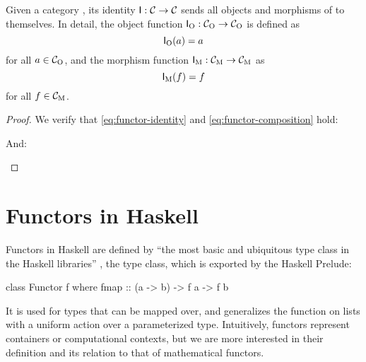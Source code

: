 \begin{example}
  \label{ex:functor-identity}


  Given a category , its identity  $\mathsf{I}:
  \mathcal{C} \to \mathcal{C}$ sends all objects and morphisms of  to
  themselves. In detail, the object function $\mathsf{I}_{\operatorname{O}}: \mathcal{C}_{\operatorname{O}} \to
  \mathcal{C}_{\operatorname{O}}$ is defined as
  \begin{equation}
    \label{eq:functor-identity-object}
    \mathsf{I}_{\operatorname{O}}(a) = a
  \end{equation}
  for all $a \in \mathcal{C}_{\operatorname{O}}$, and the morphism function $\mathsf{I}_{\operatorname{M}}:
  \mathcal{C}_{\operatorname{M}} \to \mathcal{C}_{\operatorname{M}}$ as
  \begin{equation}
    \label{eq:functor-identity-morphism}
    \mathsf{I}_{\operatorname{M}}(f) = f
  \end{equation}
  for all $f \in \mathcal{C}_{\operatorname{M}}$.

  \begin{proof}

    We verify that \eqref{eq:functor-identity} and
    \eqref{eq:functor-composition} hold:
    \begin{steps}
        \eqby{\eqref{eq:functor-identity-object}}
    \end{steps}
    And:
    \begin{steps}
    \end{steps}

  \end{proof}

\end{example}

\section{Functors in Haskell}
\label{sec:functors-haskell}

Functors in Haskell are defined by ``the most basic and ubiquitous
type class in the Haskell libraries'' \parencite[18]{yorgey-2009}, the
 type class, which is exported by the Haskell
Prelude:
\begin{codehaskell}
class Functor f where
  fmap :: (a -> b) -> f a -> f b
\end{codehaskell}
It is used for types that can be mapped over, and generalizes the
 function on lists with a uniform action over a
parameterized type. Intuitively, functors represent containers or
computational contexts, but we are more interested in their definition
and its relation to that of mathematical functors.

